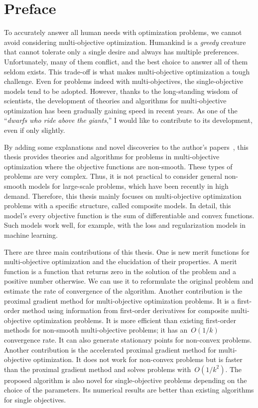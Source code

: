 \documentclass[../main]{subfiles}
\begin{document}
\chapter*{Preface}
To accurately answer all human needs with optimization problems, we cannot avoid considering multi-objective optimization.
Humankind is a \emph{greedy} creature that cannot tolerate only a single desire and always has multiple preferences.
Unfortunately, many of them conflict, and the best choice to answer all of them seldom exists. This trade-off is what makes multi-objective optimization a tough challenge.
Even for problems indeed with multi-objectives, the single-objective models tend to be adopted.
However, thanks to the long-standing wisdom of scientists, the development of theories and algorithms for multi-objective optimization has been gradually gaining speed in recent years.
As one of the ``\emph{dwarfs who ride above the giants},'' I would like to contribute to its development, even if only slightly.

By adding some explanations and novel discoveries to the author's papers~\cite{Tanabe2019,Tanabe2022,Tanabe2022a,Tanabe2022b,Tanabe2022c}, this thesis provides theories and algorithms for problems in multi-objective optimization where the objective functions are non-smooth.
These types of problems are very complex.
Thus, it is not practical to consider general non-smooth models for large-scale problems, which have been recently in high demand.
Therefore, this thesis mainly focuses on multi-objective optimization problems with a specific structure, called composite models.
In detail, this model's every objective function is the sum of differentiable and convex functions.
Such models work well, for example, with the loss and regularization models in machine learning.

There are three main contributions of this thesis.
One is new merit functions for multi-objective optimization and the elucidation of their properties.
A merit function is a function that returns zero in the solution of the problem and a positive number otherwise.
We can use it to reformulate the original problem and estimate the rate of convergence of the algorithm.
Another contribution is the proximal gradient method for multi-objective optimization problems.
It is a first-order method using information from first-order derivatives for composite multi-objective optimization problems.
It is more efficient than existing first-order methods for non-smooth multi-objective problems; it has an~$O(1/k)$ convergence rate.
It can also generate stationary points for non-convex problems. Another contribution is the accelerated proximal gradient method for multi-objective optimization.
It does not work for non-convex problems but is faster than the proximal gradient method and solves problems with~$O(1/k^2)$.
The proposed algorithm is also novel for single-objective problems depending on the choice of the parameters.
Its numerical results are better than existing algorithms for single objectives.

\begin{flushright}
\TheAuthor \\
\TheDate
\end{flushright}
\end{document}
